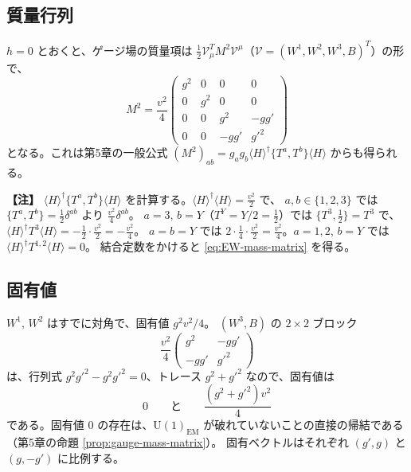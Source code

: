 \documentclass[uplatex,dvipdfmx,a4paper,11pt,openany]{jsbook}
\newenvironment{note}{\vspace{1ex}\par\footnotesize\noindent\textbf{【注】}}{\par\vspace{1ex}}
\numberwithin{equation}{chapter}
\theoremstyle{definition}
\theoremstyle{plain}
\theoremstyle{remark}
\newcommand{\U}{\mathrm{U}}
\begin{document}
\subsection{質量行列}
$h=0$ とおくと、ゲージ場の質量項は $\frac12\mathcal V_\mu^T M^2\mathcal V^\mu$（$\mathcal V=(W^1,W^2,W^3,B)^T$）の形で、
\begin{equation}
M^2=\frac{v^2}{4}
\begin{pmatrix}
g^2&0&0&0\\
0&g^2&0&0\\
0&0&g^2&-gg'\\
0&0&-gg'&g'^2
\end{pmatrix}
\label{eq:EW-mass-matrix}
\end{equation}
となる。これは第5章の一般公式 $(M^2)_{ab}=g_ag_b\langle H\rangle^\dagger\{T^a,T^b\}\langle H\rangle$ からも得られる。
\begin{note}
$\langle H\rangle^\dagger\{T^a,T^b\}\langle H\rangle$ を計算する。$\langle H\rangle^\dagger\langle H\rangle=\frac{v^2}{2}$ で、
$a,b\in\{1,2,3\}$ では $\{T^a,T^b\}=\frac12\delta^{ab}$ より $\frac{v^2}{4}\delta^{ab}$。
$a=3$, $b=Y$（$T^Y=Y/2=\frac12$）では $\{T^3,\frac12\}=T^3$ で、$\langle H\rangle^\dagger T^3\langle H\rangle=-\frac12\cdot\frac{v^2}{2}=-\frac{v^2}{4}$。
$a=b=Y$ では $2\cdot\frac14\cdot\frac{v^2}{2}=\frac{v^2}{4}$。$a=1,2$, $b=Y$ では $\langle H\rangle^\dagger T^{1,2}\langle H\rangle=0$。
結合定数をかけると \eqref{eq:EW-mass-matrix} を得る。
\end{note}
\subsection{固有値}
$W^1$, $W^2$ はすでに対角で、固有値 $g^2v^2/4$。
$(W^3,B)$ の $2\times2$ ブロック
\begin{equation}
\frac{v^2}{4}\begin{pmatrix}g^2&-gg'\\ -gg'&g'^2\end{pmatrix}
\end{equation}
は、行列式 $g^2g'^2-g^2g'^2=0$、トレース $g^2+g'^2$ なので、固有値は
\begin{equation}
0\qquad\text{と}\qquad\frac{(g^2+g'^2)v^2}{4}
\end{equation}
である。固有値 0 の存在は、$\U(1)_{\mathrm{EM}}$ が破れていないことの直接の帰結である
（第5章の命題 \ref{prop:gauge-mass-matrix}）。
固有ベクトルはそれぞれ $(g',g)$ と $(g,-g')$ に比例する。
\end{document}
